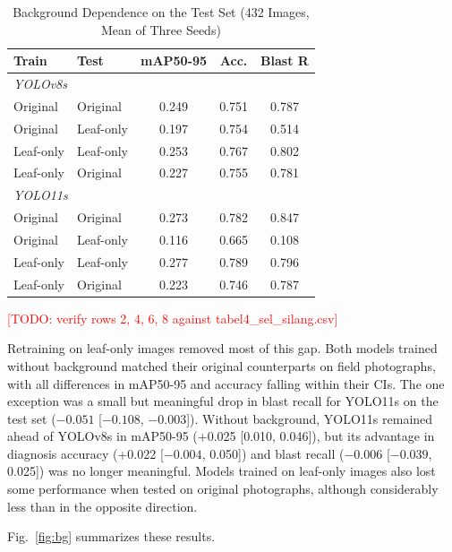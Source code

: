 \documentclass[conference]{IEEEtran}
\newcommand{\todo}[1]{\textcolor{red}{[TODO: #1]}}
\begin{document}
\begin{table}[htbp]
\caption{Background Dependence on the Test Set (432 Images, Mean of Three Seeds)}
\begin{center}
\setlength{\tabcolsep}{3pt}
\begin{tabular}{|l|l|c|c|c|}
\hline
\textbf{Train} & \textbf{Test} & \textbf{mAP50-95} & \textbf{Acc.} & \textbf{Blast R} \\
\hline
\multicolumn{5}{|l|}{\textit{YOLOv8s}} \\
\hline
Original & Original & 0.249 & 0.751 & 0.787 \\
Original & Leaf-only & 0.197 & 0.754 & 0.514 \\
Leaf-only & Leaf-only & 0.253 & 0.767 & 0.802 \\
Leaf-only & Original & 0.227 & 0.755 & 0.781 \\
\hline
\multicolumn{5}{|l|}{\textit{YOLO11s}} \\
\hline
Original & Original & 0.273 & 0.782 & 0.847 \\
Original & Leaf-only & 0.116 & 0.665 & 0.108 \\
Leaf-only & Leaf-only & 0.277 & 0.789 & 0.796 \\
Leaf-only & Original & 0.223 & 0.746 & 0.787 \\
\hline
\end{tabular}
\par\vspace{2pt}{\scriptsize Blast R: image-level diagnosis recall for blast.} \todo{verify rows 2, 4, 6, 8 against tabel4\_sel\_silang.csv}
\label{tab:bg}
\end{center}
\end{table}

Retraining on leaf-only images removed most of this gap. Both models trained without background matched their original counterparts on field photographs, with all differences in mAP50-95 and accuracy falling within their CIs. The one exception was a small but meaningful drop in blast recall for YOLO11s on the test set ($-0.051$ [$-0.108$, $-0.003$]). Without background, YOLO11s remained ahead of YOLOv8s in mAP50-95 (+0.025 [0.010, 0.046]), but its advantage in diagnosis accuracy (+0.022 [$-0.004$, 0.050]) and blast recall ($-0.006$ [$-0.039$, 0.025]) was no longer meaningful. Models trained on leaf-only images also lost some performance when tested on original photographs, although considerably less than in the opposite direction.

Fig.~\ref{fig:bg} summarizes these results.
\end{document}

